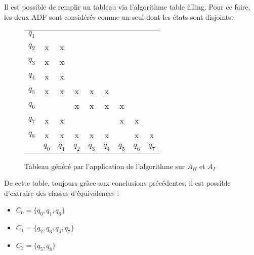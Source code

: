 Il est possible de remplir un tableau via l'algorithme table filling. Pour ce faire, les deux ADF sont considérés comme un seul dont les états sont disjoints.

\begin{figure}[H]
 \centering
 \begin{tabular}{ccccccccc}
	 \cline{2-2}
	 \multicolumn{1}{c|}{$q_1$}&\multicolumn{1}{c|}{} &&&&&&&\\
	 \cline{2-3}
	 \multicolumn{1}{c|}{$q_2$}&\multicolumn{1}{c|}{x} &\multicolumn{1}{c|}{x}&&&&&&\\
	 \cline{2-4}
	 \multicolumn{1}{c|}{$q_3$}&\multicolumn{1}{c|}{x}&\multicolumn{1}{c|}{x}&\multicolumn{1}{c|}{}&&&&&\\
	 \cline{2-5}
	 \multicolumn{1}{c|}{$q_4$}&\multicolumn{1}{c|}{x}&\multicolumn{1}{c|}{x}&\multicolumn{1}{c|}{}&\multicolumn{1}{c|}{}&&&&\\
	 \cline{2-6}
	 \multicolumn{1}{c|}{$q_5$}&\multicolumn{1}{c|}{x}&\multicolumn{1}{c|}{x}&\multicolumn{1}{c|}{x}&\multicolumn{1}{c|}{x}&\multicolumn{1}{c|}{x}&&&\\
	 \cline{2-7}
	 \multicolumn{1}{c|}{$q_6$}&\multicolumn{1}{c|}{}&\multicolumn{1}{c|}{}&\multicolumn{1}{c|}{x}&\multicolumn{1}{c|}{x}&\multicolumn{1}{c|}{x}&\multicolumn{1}{c|}{x}&&\\
	 \cline{2-8}
	 \multicolumn{1}{c|}{$q_7$}&\multicolumn{1}{c|}{x}&\multicolumn{1}{c|}{x}&\multicolumn{1}{c|}{}&\multicolumn{1}{c|}{}&\multicolumn{1}{c|}{}&\multicolumn{1}{c|}{x}&\multicolumn{1}{c|}{x}&\\
	 \cline{2-9}
	 \multicolumn{1}{c|}{$q_8$}&\multicolumn{1}{c|}{x}&\multicolumn{1}{c|}{x}&\multicolumn{1}{c|}{x}&\multicolumn{1}{c|}{x}&\multicolumn{1}{c|}{x}&\multicolumn{1}{c|}{}&\multicolumn{1}{c|}{x}&\multicolumn{1}{c|}{x}\\
	 \cline{2-9}
	 \multicolumn{1}{c}{} & $q_0$& $q_1$ & $q_2$ & $q_3$ & $q_4$ & $q_5$ & $q_6$ & $q_7$\\

 \end{tabular}
 \caption{Tableau généré par l'application de l'algorithme sur $A_H$ et $A_I$}\label{fig:tahi}
\end{figure}

De cette table, toujours grâce aux conclusions précédentes, il est possible d'extraire des classes d'équivalences :
\begin{itemize}
 \item $C_0 = \{q_0, q_1, q_6\}$
 \item $C_1 = \{q_2, q_3, q_4, q_7\}$
 \item $C_2 = \{q_5, q_8\}$
\end{itemize}

